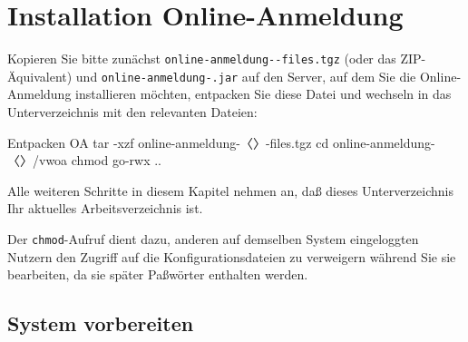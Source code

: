 \section{Installation Online-Anmeldung}\label{sec:setup-oa}

\begin{minipage}{\textwidth}
Kopieren Sie bitte zunächst \texttt{online-anmeldung-\vwiaverssw{}-files.tgz}
(oder das ZIP-Äquivalent) und \texttt{online-anmeldung-\vwiaverssw{}.jar}
auf den Server, auf dem Sie die Online-Anmeldung installieren möchten,
entpacken Sie diese Datei und wechseln in das Unterverzeichnis mit den
relevanten Dateien:

\begin{lstdump}{Entpacken OA}
tar -xzf online-anmeldung-〈\lstdumpesc{\vwiaverssw}〉-files.tgz
cd online-anmeldung-〈\lstdumpesc{\vwiaverssw}〉/vwoa
chmod go-rwx ..
\end{lstdump}
\end{minipage}

Alle weiteren Schritte in diesem Kapitel nehmen an, daß dieses
Unterverzeichnis Ihr aktuelles Arbeitsverzeichnis ist.

Der \texttt{chmod}-Aufruf dient dazu, anderen auf demselben System
eingeloggten Nutzern den Zugriff auf die Konfigurationsdateien zu
verweigern während Sie sie bearbeiten, da sie später Paßwörter
enthalten werden.

\subsection{System vorbereiten}\label{subsec:setup-oa-prep}

